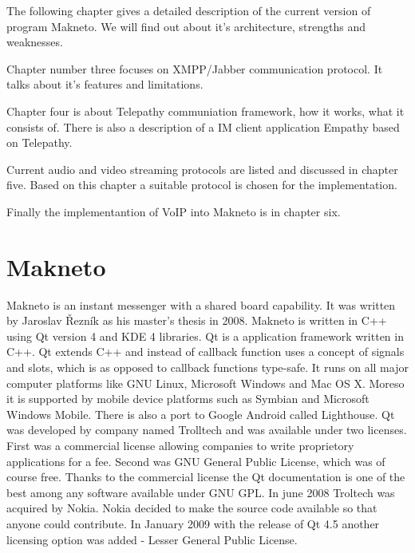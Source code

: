The following chapter gives a detailed description of the current version of program Makneto. We will find out about it's architecture, strengths and weaknesses. 

Chapter number three focuses on XMPP/Jabber communication protocol. It talks about it's features and limitations. 

Chapter four is about Telepathy communiation framework, how it works, what it consists of. There is also a description of a IM client application Empathy based on Telepathy. 

Current audio and video streaming protocols are listed and discussed in chapter five. Based on this chapter a suitable protocol is chosen for the implementation.

Finally the implementantion of VoIP into Makneto is in chapter six.  


\chapter{Makneto}
Makneto is an instant messenger with a shared board capability. It was written by Jaroslav Řezník as his master's thesis in 2008. Makneto is written in C++ using Qt version 4 and KDE 4 libraries. Qt is a application framework written in C++. Qt extends C++ and instead of callback function uses a concept of signals and slots, which is as opposed to callback functions type-safe. It runs on all major computer platforms like GNU Linux, Microsoft Windows and Mac OS X. Moreso it is supported by mobile device platforms such as Symbian and Microsoft Windows Mobile. There is also a port to Google Android called Lighthouse. Qt was developed by company named Trolltech and was available under two licenses. First was a commercial license allowing companies to write proprietory applications for a fee. Second was GNU General Public License, which was of course free. Thanks to the commercial license the Qt documentation is one of the best among any software available under GNU GPL. In june 2008 Troltech was acquired by Nokia. Nokia decided to make the source code available so that anyone could contribute. In January 2009 with the release of Qt 4.5 another licensing option was added - Lesser General Public License.\cite{wikiQt}\cite{Qt}


